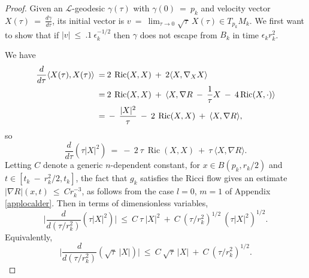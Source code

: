 \documentclass[12pt]{amsart}
\newcommand{\Ric}{\operatorname{Ric}}
\numberwithin{equation}{section}
\theoremstyle{plain}
\theoremstyle{definition}
\theoremstyle{remark}
\begin{document}
\begin{proof}
Given an ${\mathcal L}$-geodesic $\gamma(\tau)$ with
$\gamma(0) \: = \: p_k$ and
velocity vector
$X(\tau) \: = \: \frac{d\gamma}{d\tau}$, its initial vector is
$v \: = \: \lim_{\tau \rightarrow 0} \sqrt{\tau} \: X(\tau)
\in T_{p_k} M_k$.
We first want
to show that if $|v| \: \le \: .1 \: \epsilon_k^{- 1/2}$ then
$\gamma$ does not escape from $B_k$ in time
$\epsilon_k r_k^2$.

We have
\begin{align}
\frac{d}{d\tau} \langle X(\tau), X(\tau) \rangle \: = \:
& 2 \: \Ric(X, X) \: + \: 2 \langle X, \nabla_X X \rangle \\
\: = \: &
2 \: \Ric(X, X) \: + \: \langle X, 
\nabla R \: - \: \frac{1}{\tau} X \: - \: 4 \Ric(X, \cdot)
 \rangle \notag \\
\: = \: &
 - \: \frac{|X|^2}{\tau} \: - \: 2 \: \Ric(X, X) \: + \: \langle X, 
\nabla R \rangle, \notag
\end{align}
so
\begin{equation}
\frac{d}{d\tau} \left( \tau |X|^2 \right) \: = \:
- \: 2 \: \tau \: \Ric(X, X) \: + \: \tau \: \langle X, 
\nabla R \rangle.
\end{equation}
Letting $C$ denote a generic $n$-dependent constant,
for $x \in B(p_k, r_k/2)$ and $t \in [t_k \: - \: r_k^2/2,
t_k]$, the fact that $g_k$ satisfies the Ricci flow gives
an estimate $|\nabla R|(x, t) \: \le \: C r_k^{-3}$, as follows
from the case $l=0$, $m=1$ of
Appendix \ref{applocalder}.
Then in terms of dimensionless variables,
\begin{equation}
\Big| \frac{d}{d(\tau/r_k^2)} \left( \tau |X|^2 \right) \Big| \: \le \:
C \: \tau \: |X|^2 \: + \: C \: (\tau/r_k^2)^{1/2} \: 
(\tau |X|^2)^{1/2}.
\end{equation}
Equivalently,
\begin{equation}
\Big| \frac{d}{d(\tau/r_k^2)} \left( \sqrt{\tau} \: 
|X| \right) \Big| \: \le \:
C \: \sqrt{\tau} \: |X| \: + \: C \: \left(
\tau/r_k^2 \right)^{1/2}.
\end{equation}


\end{proof}
\end{document}
